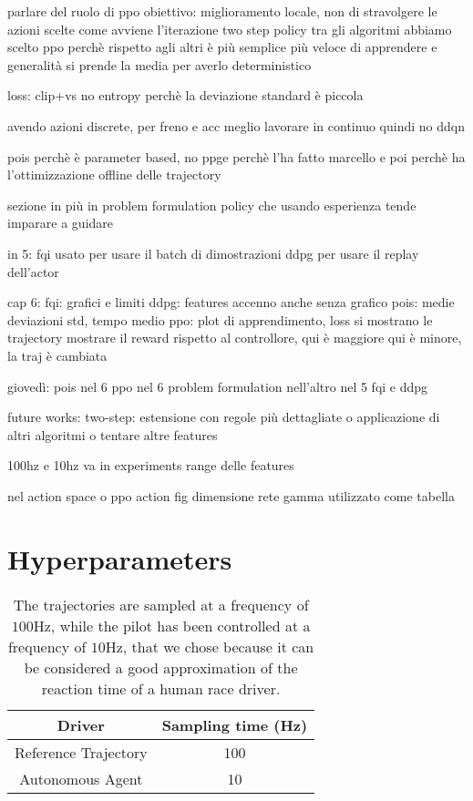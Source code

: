 parlare del ruolo di ppo
obiettivo: miglioramento locale, non di stravolgere le azioni scelte
come avviene l'iterazione two step policy
tra gli algoritmi abbiamo scelto ppo perchè rispetto agli altri è più semplice più veloce di apprendere e generalità
si prende la media per averlo deterministico

loss: clip+vs no entropy perchè la deviazione standard è piccola


avendo azioni discrete, per freno e acc
meglio lavorare in continuo quindi no ddqn


pois perchè è parameter based, no ppge perchè l'ha fatto marcello
e poi perchè ha l'ottimizzazione offline delle trajectory

sezione in più in problem formulation
policy che usando esperienza tende imparare a guidare


in 5: fqi usato per usare il batch di dimostrazioni
ddpg per usare il replay dell'actor

cap 6:
fqi: grafici e limiti
ddpg: features accenno anche senza grafico
pois: medie deviazioni std, tempo medio
ppo: plot di apprendimento, loss
si mostrano le trajectory
mostrare il reward rispetto al controllore, qui è maggiore qui è minore, la traj è cambiata


giovedì:
pois nel 6 ppo nel 6
problem formulation nell'altro
nel 5 fqi e ddpg


future works:
two-step: estensione con regole più dettagliate o applicazione di altri algoritmi o tentare altre features


100hz e 10hz va in experiments
range delle features

nel action space
o ppo action fig
dimensione rete
gamma utilizzato
come tabella




\section{Hyperparameters}

\begin{table}[H]
\centering
\begin{tabular}{|c|c|}
\hline
\textbf{Driver}                                                                      & \textbf{Sampling time (Hz)} \\ \hline
Reference  Trajectory   & 100                 \\ \hline
Autonomous Agent        & 10              \\ \hline
\end{tabular}
\caption{The trajectories are sampled at a frequency of $100$Hz, while the pilot has been controlled at a frequency of $10$Hz, that we chose because it can be considered a good approximation of the reaction time of a human race driver.}
\end{table}


